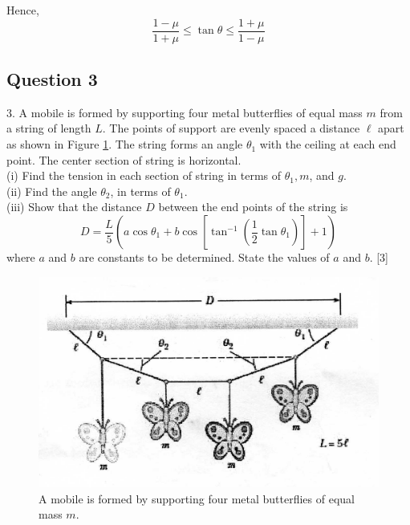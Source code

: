 \documentclass{article}
\begin{document}
Hence,
\begin{equation}
	\frac{1-\mu}{1+\mu} \leq \tan \theta \leq \frac{1+\mu}{1-\mu}
\end{equation}

\subsection{Question 3}
3. A mobile is formed by supporting four metal butterflies of equal mass $m$ from a string of length $L$. The points of support are evenly spaced a distance $\ell$ apart as shown in Figure \ref{2010q3}. The string forms an angle $\theta_{1}$ with the ceiling at each end point. The center section of string is horizontal. \\
(i) Find the tension in each section of string in terms of $\theta_{1}, m$, and $g$. \\
(ii) Find the angle $\theta_{2}$, in terms of $\theta_{1}$. \\
(iii) Show that the distance $D$ between the end points of the string is
$$
D=\frac{L}{5}\left(a \cos \theta_{1}+b \cos \left[\tan ^{-1}\left(\frac{1}{2} \tan \theta_{1}\right)\right]+1\right)
$$
where $a$ and $b$ are constants to be determined. State the values of $a$ and $b$. [3] \\

\begin{figure}
\centering
\includegraphics[width=\linewidth]{spho_book_TYS_images/2010q3.png}
\caption{A mobile is formed by supporting four metal butterflies of equal mass $m$.} \label{2010q3}
\end{figure}
\end{document}
